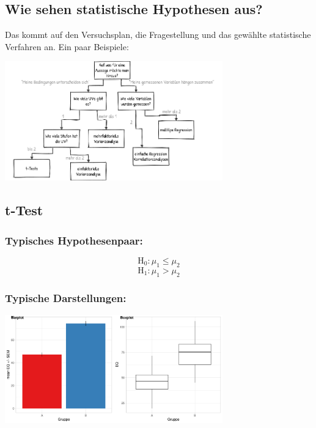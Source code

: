 \documentclass[
]{book}
\begin{document}
\hypertarget{wie-sehen-statistische-hypothesen-aus}{%
\subsection{Wie sehen statistische Hypothesen aus?}\label{wie-sehen-statistische-hypothesen-aus}}

Das kommt auf den Versuchsplan, die Fragestellung und das gewählte statistische Verfahren an. \smallskip \newline Ein paar Beispiele:

\begin{center}\includegraphics[width=266.666666666667pt]{imgs/stats} \end{center}

\hypertarget{t-test}{%
\subsection{t-Test}\label{t-test}}

\hypertarget{typisches-hypothesenpaar}{%
\subsubsection{Typisches Hypothesenpaar:}\label{typisches-hypothesenpaar}}

\[\text{H}_0: \mu_{\text{1}} \leq \mu_{\text{2}}\]
\[\text{H}_1:\mu_{\text{1}} > \mu_{\text{2}}\]

\hypertarget{typische-darstellungen}{%
\subsubsection{Typische Darstellungen:}\label{typische-darstellungen}}

\begin{center}\includegraphics[width=266.666666666667pt]{imgs/t} \end{center}
\end{document}
